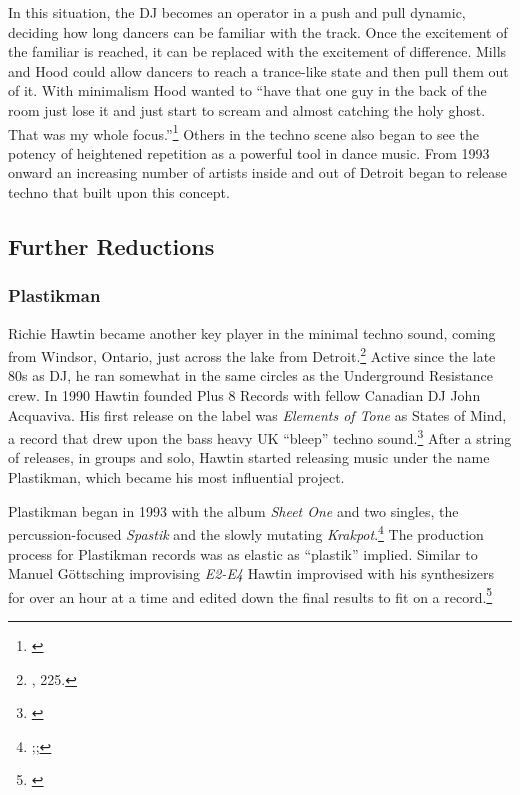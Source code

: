 \documentclass[12pt,twoside]{reedthesis}
\begin{document}
In this situation, the DJ becomes an operator in a push and pull dynamic, deciding how long dancers can be familiar with the track. Once the excitement of the familiar is reached, it can be replaced with the excitement of difference. Mills and Hood could allow dancers to reach a trance-like state and then pull them out of it. With minimalism Hood wanted to ``have that one guy in the back of the room just lose it and just start to scream and almost catching the holy ghost. That was my whole focus.''\footnote{\cite{burnsRobertHoodLecture2014}} Others in the techno scene also began to see the potency of heightened repetition as a powerful tool in dance music. From 1993 onward an increasing number of artists inside and out of Detroit began to release techno that built upon this concept.

\subsection{Further Reductions}

\subsubsection{Plastikman}

Richie Hawtin became another key player in the minimal techno sound, coming from Windsor, Ontario, just across the lake from Detroit.\footnote{\cite{reynoldsGenerationEcstasyWorld1998}, 225.} Active since the late 80s as DJ, he ran somewhat in the same circles as the Underground Resistance crew. In 1990 Hawtin founded Plus 8 Records with fellow Canadian DJ John Acquaviva. His first release on the label was \emph{Elements of Tone} as States of Mind, a record that drew upon the bass heavy UK ``bleep'' techno sound.\footnote{\cite{statesofmindElementsTone1990}} After a string of releases, in groups and solo, Hawtin started releasing music under the name Plastikman, which became his most influential project.

Plastikman began in 1993 with the album \emph{Sheet One} and two singles, the percussion-focused \emph{Spastik} and the slowly mutating \emph{Krakpot}.\footnote{\cite{plastikmanSheetOne1993};\cite{plastikmanSpastik1993};\cite{plastikmanKrakpot1993}} The production process for Plastikman records was as elastic as ``plastik'' implied. Similar to Manuel G{\"o}ttsching improvising \emph{E2-E4} Hawtin improvised with his synthesizers for over an hour at a time and edited down the final results to fit on a record.\footnote{\cite{burnsRichieHawtinLecture2013}}
\end{document}
